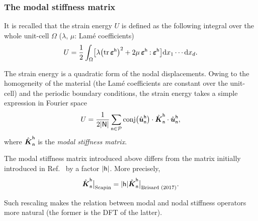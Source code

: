 \subsubsection{The modal stiffness matrix}

It is recalled that the strain energy \(U\) is defined as the following integral
over the whole unit-cell \(\Omega\) (\(\lambda\), \(\mu\): Lamé coefficients)
\begin{equation}
  U=\frac12\int_\Omega\bigl[\lambda\bigl(\operatorname{tr}\boldsymbol\varepsilon^\mathsf{h}\bigr)^2
  +2\mu\,\boldsymbol\varepsilon^\mathsf{h}\mathbin{\mathord{:}}\boldsymbol\varepsilon^\mathsf{h}\bigr]
  \mathrm d x_1\cdots\mathrm d x_d.
\end{equation}

The strain energy is a quadratic form of the nodal displacements. Owing to the
homogeneity of the material (the Lamé coefficients are constant over the
unit-cell) and the periodic boundary conditions, the strain energy takes a
simple expression in Fourier space
\begin{equation}
  \label{eq:20210914060318}
  U=\frac 1{2\lvert\mathsf{N}\rvert}
  \sum_{\mathsf{n}\in\mathcal{P}}
  \operatorname{conj}\bigl(\hat{\boldsymbol u}_\mathsf{n}^\mathsf{h}\bigr)
  \cdot\hat{\boldsymbol K}_\mathsf{n}^\mathsf{h}
  \cdot\hat{\boldsymbol u}_\mathsf{n}^\mathsf{h},
\end{equation}
where \(\hat{\boldsymbol K}_\mathsf{n}^\mathsf{h}\) is the \emph{modal stiffness matrix}.

\begin{remark}
  The modal stiffness matrix introduced above differs from the matrix initially
  introduced in Ref.~\cite{bris2017} by a factor \(\lvert\mathsf{h}\rvert\). More
  precisely,
  \begin{equation}
    \hat{\boldsymbol K}_\mathsf{n}^\mathsf{h}
    \bigr\rvert_\text{Scapin}
    =\lvert\mathsf{h}\rvert\hat{\boldsymbol K}_\mathsf{n}^\mathsf{h}
    \bigr\rvert_\text{Brisard (2017)}.
  \end{equation}

  Such rescaling makes the relation between modal and nodal stiffness operators
  more natural (the former is the DFT of the latter).
\end{remark}

